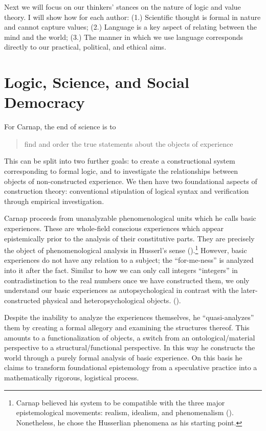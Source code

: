 \documentclass[leqno, 12pt]{turabian-researchpaper}
\begin{document}
	Next we will focus on our thinkers' stances on the nature of logic and value
	theory. I will show how for each author: (1.) Scientific thought is formal in
	nature and cannot capture values; (2.) Language is a key aspect of relating between
	the mind and the world; (3.) The manner in which we use language corresponds
	directly to our practical, political, and ethical aims.

	\section{Logic, Science, and Social Democracy}

	For Carnap, the end of science is to \blockquote[{}]{find and order the true statements about the objects of experience}.
	This can be split into two further goals: to create a constructional system
	corresponding to formal logic, and to investigate the relationships between objects
	of non-constructed experience. We then have two foundational aspects of
	construction theory: conventional stipulation of logical syntax and verification
	through empirical investigation.

	Carnap proceeds from unanalyzable phenomenological units which he calls basic experiences.
	These are whole-field conscious experiences which appear epistemically prior
	to the analysis of their constitutive parts. They are precisely the object of phenomenological
	analysis in Husserl's sense ().\footnote{Carnap
	believed his system to be compatible with the three major epistemological
	movements: realism, idealism, and phenomenalism ().
	Nonetheless, he chose the Husserlian phenomena as his starting point.} However,
	basic experiences do not have any relation to a subject; the \enquote{for-me-ness}
	is analyzed into it after the fact. Similar to how we can only call integers
	\enquote{integers} in contradistinction to the real numbers once we have constructed
	them, we only understand our basic experiences as autopsychological in
	contrast with the later-constructed physical and heteropsychological objects. ().

	Despite the inability to analyze the experiences themselves, he \enquote{quasi-analyzes}
	them by creating a formal allegory and examining the structures thereof. This
	amounts to a functionalization of objects, a switch from an ontological/material
	perspective to a structural/functional perspective. In this way he constructs
	the world through a purely formal analysis of basic experience. On this basis he
	claims to transform foundational epistemology from a speculative practice into
	a mathematically rigorous, logistical process.
\end{document}
